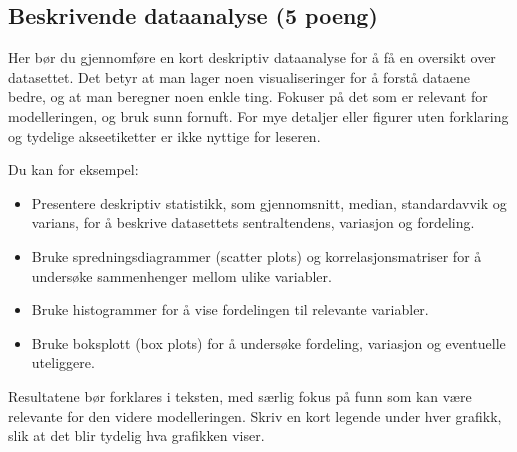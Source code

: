 \subsection{Beskrivende dataanalyse (5 poeng)}\label{beskrivende-dataanalyse-5-poeng}

Her bør du gjennomføre en kort deskriptiv dataanalyse for å få en
oversikt over datasettet. Det betyr at man lager noen visualiseringer
for å forstå dataene bedre, og at man beregner noen enkle ting. Fokuser
på det som er relevant for modelleringen, og bruk sunn fornuft. For mye
detaljer eller figurer uten forklaring og tydelige akseetiketter er ikke
nyttige for leseren.

Du kan for eksempel:

\begin{itemize}
\tightlist
\item
  Presentere deskriptiv statistikk, som gjennomsnitt, median,
  standardavvik og varians, for å beskrive datasettets sentraltendens,
  variasjon og fordeling.
\item
  Bruke spredningsdiagrammer (scatter plots) og korrelasjonsmatriser for
  å undersøke sammenhenger mellom ulike variabler.
\item
  Bruke histogrammer for å vise fordelingen til relevante variabler.
\item
  Bruke boksplott (box plots) for å undersøke fordeling, variasjon og
  eventuelle uteliggere.
\end{itemize}

Resultatene bør forklares i teksten, med særlig fokus på funn som kan
være relevante for den videre modelleringen. Skriv en kort legende under
hver grafikk, slik at det blir tydelig hva grafikken viser.
